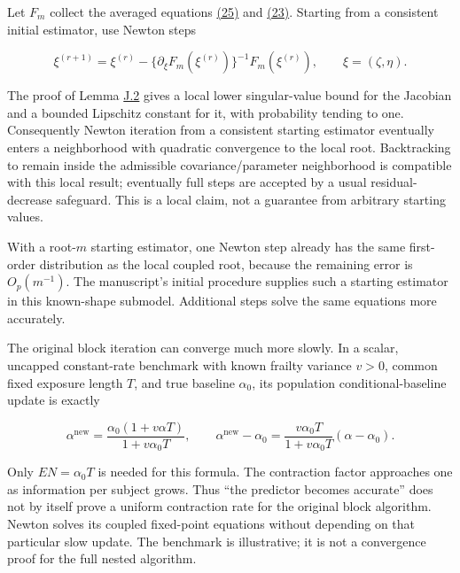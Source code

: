 \documentclass[11pt]{article}
\begin{document}
Let \(F_m\) collect the averaged equations \hyperref[eq:25]{(25)} and \hyperref[eq:23]{(23)}. Starting from a consistent initial estimator, use Newton steps

\begin{equation*}
\xi^{(r+1)}=\xi^{(r)}-
 \{\partial_\xi F_m(\xi^{(r)})\}^{-1}F_m(\xi^{(r)}),
\qquad \xi=(\zeta,\eta).
\tag{J.16}\label{eq:J.16}
\end{equation*}

The proof of Lemma \hyperref[res:Lemma-J.2]{J.2} gives a local lower singular-value bound for the Jacobian and a bounded Lipschitz constant for it, with probability tending to one. Consequently Newton iteration from a consistent starting estimator eventually enters a neighborhood with quadratic convergence to the local root. Backtracking to remain inside the admissible covariance/parameter neighborhood is compatible with this local result; eventually full steps are accepted by a usual residual-decrease safeguard. This is a local claim, not a guarantee from arbitrary starting values.

With a root-\(m\) starting estimator, one Newton step already has the same first-order distribution as the local coupled root, because the remaining error is \(O_p(m^{-1})\). The manuscript's initial procedure supplies such a starting estimator in this known-shape submodel. Additional steps solve the same equations more accurately.

The original block iteration can converge much more slowly. In a scalar, uncapped constant-rate benchmark with known frailty variance \(v>0\), common fixed exposure length \(T\), and true baseline \(\alpha_0\), its population conditional-baseline update is exactly

\begin{equation*}
\alpha^{\mathrm{new}}=
 \frac{\alpha_0(1+v\alpha T)}{1+v\alpha_0T},\qquad
\alpha^{\mathrm{new}}-\alpha_0=
 \frac{v\alpha_0T}{1+v\alpha_0T}(\alpha-\alpha_0).
\tag{J.17}\label{eq:J.17}
\end{equation*}

Only \(EN=\alpha_0T\) is needed for this formula. The contraction factor approaches one as information per subject grows. Thus ``the predictor becomes accurate'' does not by itself prove a uniform contraction rate for the original block algorithm. Newton solves its coupled fixed-point equations without depending on that particular slow update. The benchmark is illustrative; it is not a convergence proof for the full nested algorithm.
\end{document}
